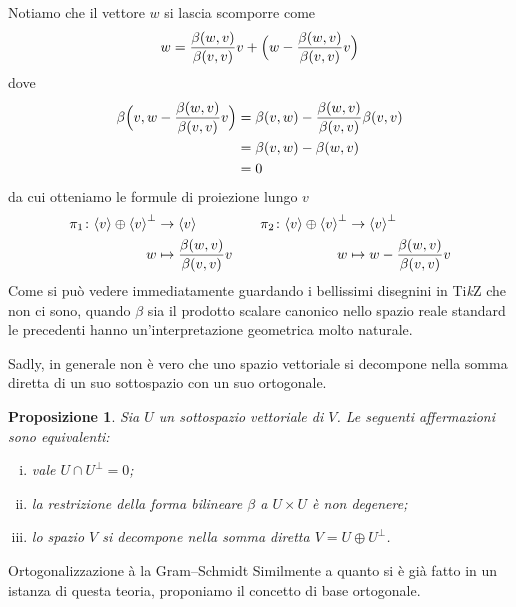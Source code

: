 \documentclass[a4paper]{amsproc}
\makeatletter
\theoremstyle{plain}
\newtheorem{prp}{Proposizione}[section]
\theoremstyle{definition}
\theoremstyle{remark}
\DeclarePairedDelimiter{\cl}{\langle}{\rangle}
\def\paragraph{\@startsection{paragraph}{4}%
  \z@\z@{-\fontdimen2\font}%
  {\normalfont\bfseries}}
\makeatother
\begin{document}
Notiamo che il vettore $ w $ si lascia scomporre come
\[
  w = \frac{\beta(w,v)}{\beta(v,v)}v + \Bigl(w - \frac{\beta(w,v)}{\beta(v,v)}v\Bigr)
\]
dove
\[
  \begin{aligned}
    \beta\Bigl(v, w - \frac{\beta(w,v)}{\beta(v,v)}v\Bigr) &= \beta(v,w) - \frac{\beta(w,v)}{\beta(v,v)}\beta(v,v)\\
    &= \beta(v,w) - \beta(w,v)\\
    &= 0
  \end{aligned}
\]
da cui otteniamo le formule di proiezione lungo $ v $
\[
  \begin{aligned}
    \pi_1\colon\cl v\oplus{\cl v}^\perp&\to\cl v\\
    w&\mapsto\frac{\beta(w,v)}{\beta(v,v)}v
  \end{aligned}
  \qquad%
  \begin{aligned}
    \pi_2\colon\cl v\oplus{\cl v}^\perp &\to{\cl v}^\perp\\
    w &\mapsto w - \frac{\beta(w,v)}{\beta(v,v)}v
  \end{aligned}
\]
Come si può vedere immediatamente guardando i bellissimi disegnini in Ti\textit{k}Z che non ci sono, quando $ \beta $ sia il prodotto scalare canonico nello spazio reale standard le precedenti hanno un'interpretazione geometrica molto naturale.

Sadly, in generale non è vero che uno spazio vettoriale si decompone nella somma diretta di un suo sottospazio con un suo ortogonale.

\begin{prp}
  Sia $ U $ un sottospazio vettoriale di $ V $. Le seguenti affermazioni sono equivalenti:
  \begin{enumerate}[(i)]
  \item vale $ U\cap U^\perp  = 0 $;
  \item la restrizione della forma bilineare $ \beta $ a $ U\times U $ è non degenere;
  \item lo spazio $ V $ si decompone nella somma diretta $ V = U\oplus U^\perp $.
  \end{enumerate}
\end{prp}
\smallskip

\paragraph{Ortogonalizzazione à la Gram--Schmidt}
Similmente a quanto si è già fatto in un istanza di questa teoria, proponiamo il concetto di base ortogonale.
\end{document}
